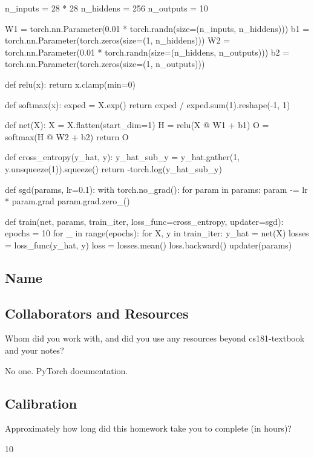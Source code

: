 \documentclass[submit]{harvardml}
\begin{document}
\begin{python}
n_inputs = 28 * 28
n_hiddens = 256
n_outputs = 10

W1 = torch.nn.Parameter(0.01 * torch.randn(size=(n_inputs, n_hiddens)))
b1 = torch.nn.Parameter(torch.zeros(size=(1, n_hiddens)))
W2 = torch.nn.Parameter(0.01 * torch.randn(size=(n_hiddens, n_outputs)))
b2 = torch.nn.Parameter(torch.zeros(size=(1, n_outputs)))



def relu(x):
	return x.clamp(min=0)



def softmax(x):
	exped = X.exp()
	return exped / exped.sum(1).reshape(-1, 1)



def net(X):
	X = X.flatten(start_dim=1)
	H = relu(X @ W1 + b1)
	O = softmax(H @ W2 + b2)
	return O



def cross_entropy(y_hat, y):
	y_hat_sub_y = y_hat.gather(1, y.unsqueeze(1)).squeeze()
	return -torch.log(y_hat_sub_y)



def sgd(params, lr=0.1):
	with torch.no_grad():
		for param in params:
			param -= lr * param.grad
			param.grad.zero_()



def train(net, params, train_iter, loss_func=cross_entropy, updater=sgd):
	epochs = 10
	for _ in range(epochs):
		for X, y in train_iter:
			y_hat = net(X)
			losses = loss_func(y_hat, y)
			loss = losses.mean()
			loss.backward()
			updater(params)
\end{python}


\newpage
\subsection*{Name}

\subsection*{Collaborators and Resources}
Whom did you work with, and did you use any resources beyond cs181-textbook and your notes?

No one. PyTorch documentation.

\subsection*{Calibration}
Approximately how long did this homework take you to complete (in hours)? 

10
\end{document}
